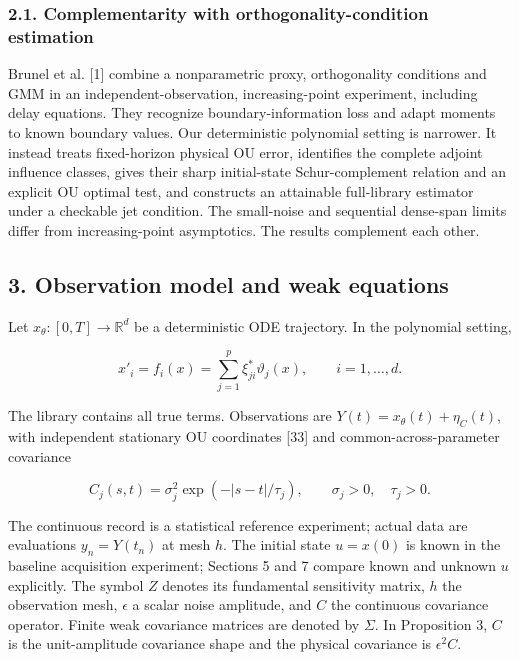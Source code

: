 \documentclass[
  american,
  11pt,
]{article}
\begin{document}
\subsubsection{2.1. Complementarity with orthogonality-condition
estimation}\label{complementarity-with-orthogonality-condition-estimation}

Brunel et al. {[}1{]} combine a nonparametric proxy, orthogonality
conditions and GMM in an independent-observation, increasing-point
experiment, including delay equations. They recognize
boundary-information loss and adapt moments to known boundary values.
Our deterministic polynomial setting is narrower. It instead treats
fixed-horizon physical OU error, identifies the complete adjoint
influence classes, gives their sharp initial-state Schur-complement
relation and an explicit OU optimal test, and constructs an attainable
full-library estimator under a checkable jet condition. The small-noise
and sequential dense-span limits differ from increasing-point
asymptotics. The results complement each other.

\subsection{3. Observation model and weak
equations}\label{observation-model-and-weak-equations}

Let \(x_\theta:[0,T]\to\mathbb R^d\) be a deterministic ODE trajectory.
In the polynomial setting,

\[
x'_i=f_i(x)=\sum_{j=1}^{p}\xi^*_{ji}\vartheta_j(x),\qquad i=1,\ldots,d.
\]

The library contains all true terms. Observations are
\(Y(t)=x_\theta(t)+\eta_C(t)\), with independent stationary OU
coordinates {[}33{]} and common-across-parameter covariance

\[
C_j(s,t)=\sigma_j^2\exp(-|s-t|/\tau_j),\qquad \sigma_j>0,\quad\tau_j>0.
\]

The continuous record is a statistical reference experiment; actual data
are evaluations \(y_n=Y(t_n)\) at mesh \(h\). The initial state
\(u=x(0)\) is known in the baseline acquisition experiment; Sections 5
and 7 compare known and unknown \(u\) explicitly. The symbol \(Z\)
denotes its fundamental sensitivity matrix, \(h\) the observation mesh,
\(\epsilon\) a scalar noise amplitude, and \(C\) the continuous
covariance operator. Finite weak covariance matrices are denoted by
\(\Sigma\). In Proposition 3, \(C\) is the unit-amplitude covariance
shape and the physical covariance is \(\epsilon^2 C\).
\end{document}
